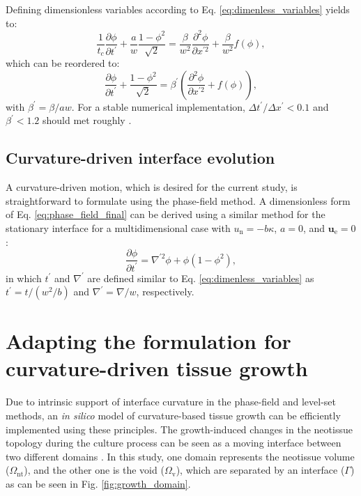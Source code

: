Defining dimensionless variables according to Eq. \ref{eq:dimenless_variables} yields to:
\begin{equation}
\frac{1}{t_c}\frac{\partial \phi}{\partial t^{\prime}}+\frac{a}{w} \frac{1-\phi^{2}}{\sqrt{2}}=\frac{\beta}{w^2} \frac{\partial^{2} \phi}{\partial x^{\prime 2}} + \frac{\beta}{w^{2}}f(\phi),
\end{equation}
which can be reordered to:
\begin{equation}
\frac{\partial \phi}{\partial t^{\prime}}+\frac{1-\phi^{2}}{\sqrt{2}}=\beta^{\prime}\left( \frac{\partial^{2} \phi}{\partial x^{\prime 2}} + f(\phi)\right),
\end{equation}
with $\beta^{\prime}=\beta/aw$. For a stable numerical implementation, $\Delta t^{\prime}/\Delta x^{\prime} < 0.1$ and $\beta^{\prime} < 1.2$ should met roughly \cite{Sun2007}.


\subsection{Curvature-driven interface evolution}

A curvature-driven motion, which is desired for the current study, is straightforward to formulate using the phase-field method. A dimensionless form of Eq. \ref{eq:phase_field_final} can be derived using a similar method for the stationary interface for a multidimensional case with $u_{\mathrm{n}}=-b\kappa$, $a=0$, and $\boldsymbol{u}_{\mathrm{e}}=0$:
\begin{equation} \label{eq:pf_curvature}
\frac{\partial \phi}{\partial t^{\prime}}=\nabla^{\prime 2} \phi+\phi\left(1-\phi^{2}\right),
\end{equation}
in which $t^{\prime}$ and $\nabla^{\prime}$ are defined similar to Eq. \ref{eq:dimenless_variables} as $t^{\prime}=t/(w^2/b)$ and $\nabla^{\prime}=\nabla/w$, respectively.

\section{Adapting the formulation for  curvature-driven tissue growth}

Due to intrinsic support of interface curvature in the phase-field and level-set methods, an \textit{in silico} model of curvature-based tissue growth can be efficiently implemented using these principles. The growth-induced changes in the neotissue topology during the culture process can be seen as a moving interface between two different domains \cite{Rumpler2008}. In this study, one domain represents the neotissue volume  ($\Omega_{\text{nt}}$), and the other one is the void ($\Omega_{\text{v}}$), which are separated by an interface ($\Gamma$) as can be seen in Fig. \ref{fig:growth_domain}.

